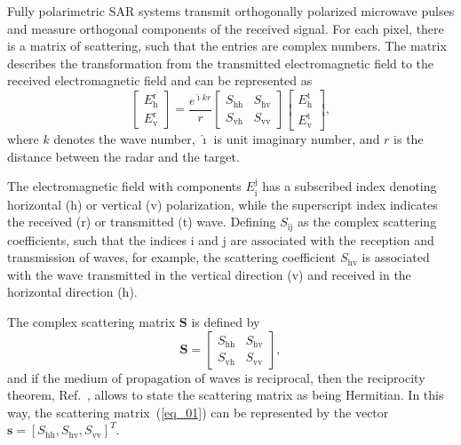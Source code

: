 \documentclass[conference]{IEEEtran}
\begin{document}
Fully polarimetric SAR systems transmit orthogonally polarized microwave pulses and measure orthogonal components of the received signal. For each pixel, there is a matrix of scattering, such that the entries are complex numbers. The matrix describes the transformation from the transmitted electromagnetic field to the received electromagnetic field and can be represented as
\begin{equation*}
 \left[
\begin{array}{c}
	E_{\text{h}}^{\text{r}}   \\
	E_{\text{v}}^{\text{r}}    
\end{array}
\right]
 = \frac{e^{\hat{\imath} kr}}{r}\left[
\begin{array}{cc}
	S_\text{hh}   & S_\text{hv}   \\
	S_\text{vh}   & S_\text{vv}   
\end{array}
\right]
 \left[
\begin{array}{c}
	E_{\text{h}}^{\text{t}}   \\
	E_{\text{v}}^{\text{t}}    
\end{array}
\right],
\end{equation*}
where $k$ denotes the wave number, $\hat{\imath}$ is unit imaginary number, and $r$ is the distance between the radar and the target. 

The electromagnetic field with components $E_{\text{i}}^{\text{j}}$ has a subscribed index denoting horizontal (h) or vertical (v) polarization, while the superscript index indicates the received (r) or transmitted (t) wave. Defining $S_\text{ij}$ as the complex scattering coefficients, such that the indices $\text{i}$ and $\text{j}$ are associated with the reception and transmission of waves, for example, the scattering coefficient $S_\text{hv}$ is associated with the wave transmitted in the vertical direction (v) and received in the horizontal direction (h).

The complex scattering matrix $\mathbf{S}$ is defined by
\begin{equation}
\mathbf{S} = \left[
\begin{array}{cc}
	S_\text{hh}   & S_\text{hv}   \\
	S_\text{vh}   & S_\text{vv}   
\end{array}
\right],
\label{eq_01}
\end{equation}
and if the medium of propagation of waves is reciprocal, then the reciprocity theorem, Ref.~\cite{lp}, allows to state the scattering matrix as being Hermitian.  In this way, the scattering matrix~(\ref{eq_01}) can be represented by the vector $\mathbf{s}=[S_\text{hh},S_\text{hv},S_{\text{vv}}]^T$.
\end{document}
